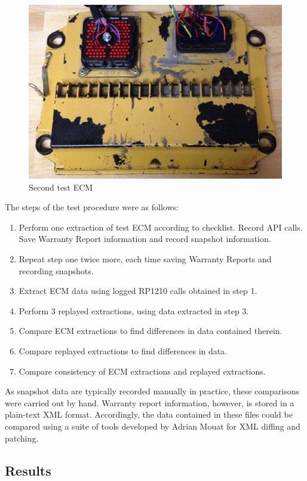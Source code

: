 \begin{figure}[h]
  \centering
  \includegraphics[scale=.2]{cat-ecm-2}
  \caption{Second test ECM}
  \label{fig:cat-ecm-2}
\end{figure}


The steps of the test procedure were as follows:

\begin{enumerate}
  \item Perform one extraction of test ECM according to checklist. Record API calls. Save Warranty Report information and record snapshot information.
  \item Repeat step one twice more, each time saving Warranty Reports and recording snapshots.
  \item Extract ECM data using logged RP1210 calls obtained in step 1.
  \item Perform 3 replayed extractions, using data extracted in step 3.
  \item Compare ECM extractions to find differences in data contained therein.
  \item Compare replayed extractions to find differences in data.
  \item Compare consistency of ECM extractions and replayed extractions.
\end{enumerate}

As snapshot data are typically recorded manually in practice, these comparisons were carried out by hand. Warranty report information, however,
is stored in a plain-text XML format. Accordingly, the data contained in these files could be compared using a suite of tools developed
by Adrian Mouat\cite{Mouat2002} for XML diffing and patching.

\subsection{Results}

